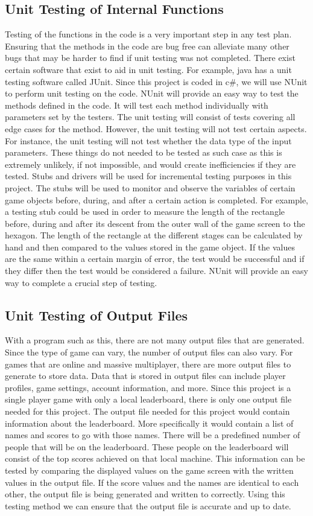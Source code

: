 \documentclass[12pt, titlepage]{article}
\begin{document}
\subsection{Unit Testing of Internal Functions}
Testing of the functions in the code is a very important step in any test plan. Ensuring that the methods in the code are bug free can alleviate many other bugs that may be harder to find if unit testing was not completed. There exist certain software that exist to aid in unit testing. For example, java has a unit testing software called JUnit. Since this project is coded in c\#, we will use NUnit to perform unit testing on the code. NUnit will provide an easy way to test the methods defined in the code. It will test each method individually with parameters set by the testers. The unit testing will consist of tests covering all edge cases for the method. However, the unit testing will not test certain aspects. For instance, the unit testing will not test whether the data type of the input parameters. These things do not needed to be tested as such case as this is extremely unlikely, if not impossible, and would create inefficiencies if they are tested. Stubs and drivers will be used for incremental testing purposes in this project. The stubs will be used to monitor and observe the variables of certain game objects before, during, and after a certain action is completed. For example, a testing stub could be used in order to measure the length of the rectangle before, during and after its descent from the outer wall of the game screen to the hexagon. The length of the rectangle at the different stages can be calculated by hand and then compared to the values stored in the game object. If the values are the same within a certain margin of error, the test would be successful and if they differ then the test would be considered a failure. NUnit will provide an easy way to complete a crucial step of testing.

\subsection{Unit Testing of Output Files}
With a program such as this, there are not many output files that are generated. Since the type of game can vary, the number of output files can also vary. For games that are online and massive multiplayer, there are more output files to generate to store data. Data that is stored in output files can include player profiles, game settings, account information, and more. Since this project is a single player game with only a local leaderboard, there is only one output file needed for this project. The output file needed for this project would contain information about the leaderboard. More specifically it would contain a list of names and scores to go with those names. There will be a predefined number of people that will be on the leaderboard. These people on the leaderboard will consist of the top scores achieved on that local machine. This information can be tested by comparing the displayed values on the game screen with the written values in the output file. If the score values and the names are identical to each other, the output file is being generated and written to correctly. Using this testing method we can ensure that the output file is accurate and up to date.
\end{document}
